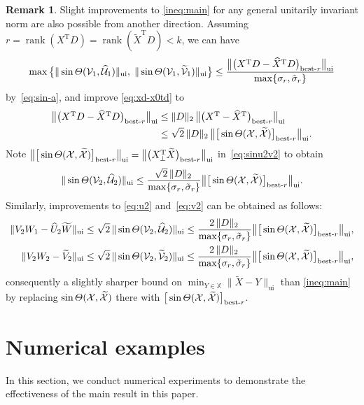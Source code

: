 \documentclass[11pt]{article}
\def\bbX{\mathbb{X}}
\def\cU{{\cal U}}
\def\cV{{\cal V}}
\def\cX{{\cal X}}
\DeclareMathOperator{\rank}{rank}
\DeclareMathOperator{\T}{T}
\DeclareMathOperator{\UI}{ui}
\def\wtd{\widetilde}
\def\what{\widehat}
\def\bestr{\mbox{\scriptsize\rm best-$r$}}
\theoremstyle{definition}
\newtheorem{remark}{Remark}[section]
\numberwithin{equation}{section}
\numberwithin{figure}{section}
\numberwithin{table}{section}
\begin{document}
\begin{remark}\label{rk:main'}
Slight improvements to \eqref{ineq:main} for any general unitarily invariant norm are also possible from another direction.
Assuming $r=\rank(X^{\T}D)=\rank(\wtd X^{\T}D)<k$, we can have
\[
\max\big\{\|\sin\Theta(\cV_1,\what\cU_1)\|_{\UI},\; \|\sin\Theta(\cV_1,\wtd\cV_1)\|_{\UI}\big\}
\le\frac{\big\|\big(X^{\T}D-\what X^{\T}D\big)_{\bestr}\big\|_{\UI}}{\max\{\sigma_r,\tilde\sigma_r\}}
\]
by~\eqref{eq:sin-a},  and improve \eqref{eq:xd-x0td} to
\begin{align}
\big\|\big(X^{\T}D-\what X^{\T}D\big)_{\bestr}\big\|_{\UI}
    &\le \|D\|_2\,\big\|\big(X^{\T}-\what X^{\T}\big)_{\bestr}\big\|_{\UI} \nonumber \\
    &\le\sqrt 2\,\|D\|_2\,\big\|\big[\sin\Theta(\cX,\wtd\cX)\big]_{\bestr}\big\|_{\UI}.  \label{eq:xd-x0td'}
\end{align}
Note
$\big\|\big[\sin\Theta(\cX,\wtd\cX)\big]_{\bestr}\big\|_{\UI}
=\big\|\big(X_{\perp}^{\T}\wtd X\big)_{\bestr}\big\|_{\UI}$ in~\eqref{eq:sinu2v2} to obtain
\[
\|\sin\Theta(\cV_2,\what\cU_2)\|_{\UI}\le\frac{\sqrt 2\,\|D\|_2\,}{\max\{\sigma_r,\tilde\sigma_r\}}
\big\|\big[\sin\Theta(\cX,\wtd\cX)\big]_{\bestr}\big\|_{\UI}.
\]
Similarly, improvements to \eqref{eq:u2} and~\eqref{eq:v2} can be obtained as follows:
\begin{align*}
   \|V_2W_1-\what U_2\wtd W\|_{\UI}&\le\sqrt 2\,\|\sin\Theta(\cV_2,\what\cU_2)\|_{\UI}
\le\frac{2\,\|D\|_2\,}{\max\{\sigma_r,\tilde\sigma_r\}}
\big\|\big[\sin\Theta(\cX,\wtd\cX)\big]_{\bestr}\big\|_{\UI},\\
   \|V_2W_2-\wtd V_2\|_{\UI}&\le\sqrt 2\,\|\sin\Theta(\cV_2,\wtd\cV_2)\|_{\UI}
\le\frac{2\,\|D\|_2\,}{\max\{\sigma_r,\tilde\sigma_r\}}
\big\|\big[\sin\Theta(\cX,\wtd\cX)\big]_{\bestr}\big\|_{\UI},
\end{align*}
consequently a slightly sharper bound on $\min_{Y\in\bbX}\|\wtd X-Y\|_{\UI}$ than \eqref{ineq:main} by replacing
$\sin\Theta(\cX,\wtd\cX)$ there with $\big[\sin\Theta(\cX,\wtd\cX)\big]_{\bestr}$.
\end{remark}

\section{Numerical examples}\label{sec:num}
In this section, we conduct  numerical experiments
to demonstrate the effectiveness of the main result in this paper.
\end{document}
